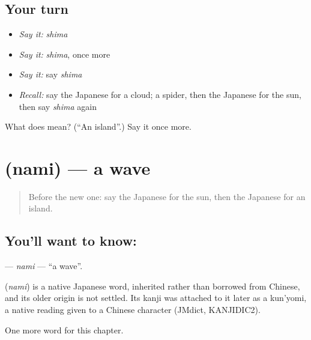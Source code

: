 \subsection*{Your turn}
\begin{itemize}
\raggedright
  \item \emph{Say it:} \emph{shima}
  \item \emph{Say it:} \emph{shima}, once more
  \item \emph{Say it:} say \emph{shima}
  \item \emph{Recall:} say the Japanese for a cloud; a spider, then the Japanese for the sun, then say \emph{shima} again
\end{itemize}

\begin{tcolorbox}[breakable,colback=teal!4,colframe=teal!35!black,title={Before you move on}]
What does  mean? (\textquotedblleft{}An island\textquotedblright{}.) Say it once more.
\end{tcolorbox}
\section[\texorpdfstring{\ja{なみ} (nami)}{なみ (nami)}]{ (nami) — a wave}

\label{lesson:JA-C44-nami}



\begin{quote}
Before the new one: say the Japanese for the sun, then the Japanese for an island.
\end{quote}

\subsection*{You'll want to know: }
\textbf{} — \emph{nami} — \textquotedblleft{}a wave\textquotedblright{}.

\begin{cousinweb}
\textbf{} (\emph{nami}) is a native Japanese word, inherited rather than borrowed from Chinese, and its older origin is not settled. Its kanji was attached to it later as a kun'yomi, a native reading given to a Chinese character (JMdict, KANJIDIC2).
\end{cousinweb}

\begin{grammarlens}[title={What you've built}]
One more word for this chapter.
\end{grammarlens}

